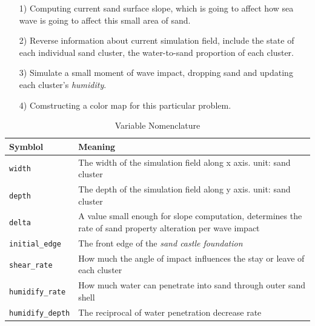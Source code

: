 \documentclass[12pt]{article}
\begin{document}
\begin{itemize}
    \item [1)]
          Computing current sand surface slope, which is going to affect how sea wave is going to affect this small area of sand.
    \item [2)]
          Reverse information about current simulation field, include the state of each individual sand cluster, the water-to-sand proportion of each cluster.
    \item [3)]
          Simulate a small moment of wave impact, dropping sand and updating each cluster's \textit{humidity}.
    \item [4)]
          Comstructing a color map for this particular problem.
\end{itemize}

\begin{table}[H]
    \caption{Variable Nomenclature}
    \vspace{10pt}
    \centering
    \begin{tabular}{p{3cm}p{12cm}}
        \hline
        \textbf{Symblol}           & \textbf{Meaning}                                                                                            \\
        \hline
        \texttt{width}             & The width of the simulation field along x axis. unit: sand cluster                                          \\
        \texttt{depth}             & The depth of the simulation field along y axis. unit: sand cluster                                          \\
        \texttt{delta}             & A value small enough for slope computation, determines the rate of sand property alteration per wave impact \\
        \texttt{initial\_edge}     & The front edge of the \textit{sand castle foundation}                                                       \\
        \texttt{shear\_rate}       & How much the angle of impact influences the stay or leave of each cluster                                   \\
        \texttt{humidify\_rate}    & How much water can penetrate into sand through outer sand shell                                             \\
        \texttt{humidify\_depth}   & The reciprocal of water penetration decrease rate                                                           \\

\end{tabular}
\end{table}
\end{document}
